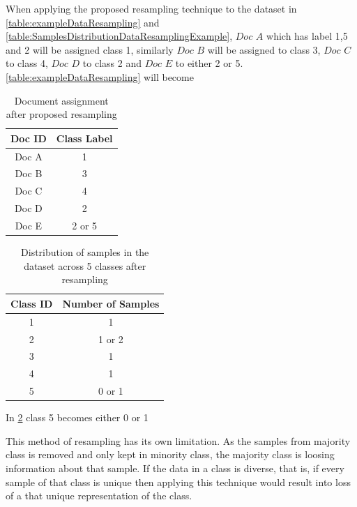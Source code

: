 When applying the proposed resampling technique to the dataset in \ref{table:exampleDataResampling} and  \ref{table:SamplesDistributionDataResamplingExample}, $Doc$ $A$ which has label 1,5 and 2 will be assigned class 1, similarly $Doc$ $B$ will be assigned to class 3, $Doc$ $C$  to class 4, $Doc$ $D$ to class 2 and $Doc$ $E$ to either 2 or 5. \ref{table:exampleDataResampling} will become

\begin{table}[!ht]
\centering
\begin{tabular}{cc}

\hline
\textbf{Doc ID} & \textbf{Class Label} \\ \hline
Doc A           & 1                \\ 
Doc B           & 3                    \\ 
Doc C           & 4                  \\ 
Doc D           & 2                   \\ 
Doc E           & 2 or 5                  \\ \hline
\end{tabular}
\captionsetup{justification=centering,margin=2cm}
\caption{Document assignment after proposed resampling}
\label{table:exampleDataResamplingAfterResampling}
\end{table}
\clearpage
\begin{table}[!ht]
\centering
\begin{tabular}{cc}
\hline
\textbf{Class ID} & \textbf{Number of Samples} \\ \hline
1                 & 1                        \\ 
2                 & 1 or 2                          \\ 
3                 & 1                          \\ 
4                 & 1                          \\ 
5                 & 0 or 1                         \\ \hline
\end{tabular}
\captionsetup{justification=centering,margin=2cm}
\caption{Distribution of samples in the dataset across 5 classes after resampling}
\label{table:SamplesDistributionDataResamplingExampleAfterResampling}
\end{table}

In \ref{table:SamplesDistributionDataResamplingExampleAfterResampling} class 5 becomes either 0 or 1

This method of resampling has its own limitation. As the samples from majority class is removed and only kept in minority class, the majority class is loosing information about that sample. If the data in a class is diverse, that is, if every sample of that class is unique then applying this technique would result into loss of a that unique representation of the class.


